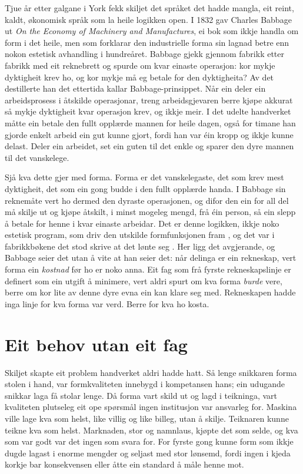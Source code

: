 Tjue år etter galgane i York fekk skiljet det språket det hadde mangla, eit reint, kaldt, økonomisk språk som la heile logikken open. I 1832 gav Charles Babbage ut \textit{On the Economy of Machinery and Manufactures}, ei bok som ikkje handla om form i det heile, men som forklarar den industrielle forma sin lagnad betre enn nokon estetisk avhandling i hundreåret. Babbage gjekk gjennom fabrikk etter fabrikk med eit reknebrett og spurde om kvar einaste operasjon: kor mykje dyktigheit krev ho, og kor mykje må eg betale for den dyktigheita? Av det destillerte han det ettertida kallar Babbage-prinsippet. Når ein deler ein arbeidsprosess i åtskilde operasjonar, treng arbeidsgjevaren berre kjøpe akkurat så mykje dyktigheit kvar operasjon krev, og ikkje meir. I det udelte handverket måtte ein betale den fullt opplærde mannen for heile dagen, også for timane han gjorde enkelt arbeid ein gut kunne gjort, fordi han var éin kropp og ikkje kunne delast. Deler ein arbeidet, set ein guten til det enkle og sparer den dyre mannen til det vanskelege.

Sjå kva dette gjer med forma. Forma er det vanskelegaste, det som krev mest dyktigheit, det som ein gong budde i den fullt opplærde handa. I Babbage sin reknemåte vert ho dermed den dyraste operasjonen, og difor den ein for all del må skilje ut og kjøpe åtskilt, i minst mogeleg mengd, frå éin person, så ein slepp å betale for henne i kvar einaste arbeidar. Det er denne logikken, ikkje noko estetisk program, som driv den utskilde formfunksjonen fram \autocite{heskett1980}, og det var i fabrikkbøkene det stod skrive at det lønte seg \autocite{forty1986}. Her ligg det avgjerande, og Babbage seier det utan å vite at han seier det: når delinga er ein rekneskap, vert forma ein \emph{kostnad} før ho er noko anna. Eit fag som frå fyrste rekneskapslinje er definert som ein utgift å minimere, vert aldri spurt om kva forma \emph{burde} vere, berre om kor lite av denne dyre evna ein kan klare seg med. Rekneskapen hadde inga linje for kva forma var verd. Berre for kva ho kosta.

\section{Eit behov utan eit fag}

Skiljet skapte eit problem handverket aldri hadde hatt. Så lenge snikkaren forma stolen i hand, var formkvaliteten innebygd i kompetansen hans; ein udugande snikkar laga få stolar lenge. Då forma vart skild ut og lagd i teikninga, vart kvaliteten plutseleg eit ope spørsmål ingen institusjon var ansvarleg for. Maskina ville lage kva som helst, like villig og like billeg, utan å skilje. Teiknaren kunne teikne kva som helst. Marknaden, stor og namnlaus, kjøpte det som selde, og kva som var godt var det ingen som svara for. For fyrste gong kunne form som ikkje dugde lagast i enorme mengder og seljast med stor lønsemd, fordi ingen i kjeda korkje bar konsekvensen eller åtte ein standard å måle henne mot.

